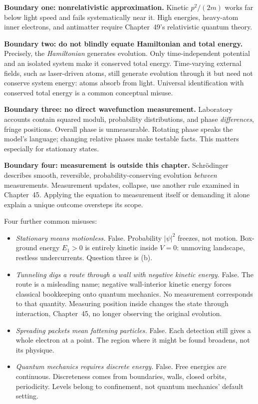 \begin{mainline}
\textbf{Boundary one: nonrelativistic approximation.} Kinetic \(p^{2}/(2m)\) works far below light speed and fails systematically near it. High energies, heavy-atom inner electrons, and antimatter require Chapter~49's relativistic quantum theory.

\textbf{Boundary two: do not blindly equate Hamiltonian and total energy.} Precisely, the \emph{Hamiltonian} generates evolution. Only time-independent potential and an isolated system make it conserved total energy. Time-varying external fields, such as laser-driven atoms, still generate evolution through it but need not conserve system energy: atoms absorb from light. Universal identification with conserved total energy is a common conceptual misuse.

\textbf{Boundary three: no direct wavefunction measurement.} Laboratory accounts contain squared moduli, probability distributions, and phase \emph{differences}, fringe positions. Overall phase is unmeasurable. Rotating phase speaks the model's language; changing relative phases make testable facts. This matters especially for stationary states.

\textbf{Boundary four: measurement is outside this chapter.} Schrödinger describes smooth, reversible, probability-conserving evolution \emph{between} measurements. Measurement updates, collapse, use another rule examined in Chapter~45. Applying the equation to measurement itself or demanding it alone explain a unique outcome oversteps its scope.

Four further common misuses:

\begin{itemize}[leftmargin=1.8em]
  \item \emph{Stationary means motionless.} False. Probability \(|\psi|^{2}\) freezes, not motion. Box-ground energy \(E_{1}>0\) is entirely kinetic inside \(V=0\): unmoving landscape, restless undercurrents. Question three is (b).
  \item \emph{Tunneling digs a route through a wall with negative kinetic energy.} False. The route is a misleading name; negative wall-interior kinetic energy forces classical bookkeeping onto quantum mechanics. No measurement corresponds to that quantity. Measuring position inside changes the state through interaction, Chapter~45, no longer observing the original evolution.
  \item \emph{Spreading packets mean fattening particles.} False. Each detection still gives a whole electron at a point. The region where it might be found broadens, not its physique.
  \item \emph{Quantum mechanics requires discrete energy.} False. Free energies are continuous. Discreteness comes from boundaries, walls, closed orbits, periodicity. Levels belong to confinement, not quantum mechanics' default setting.
\end{itemize}
\end{mainline}

